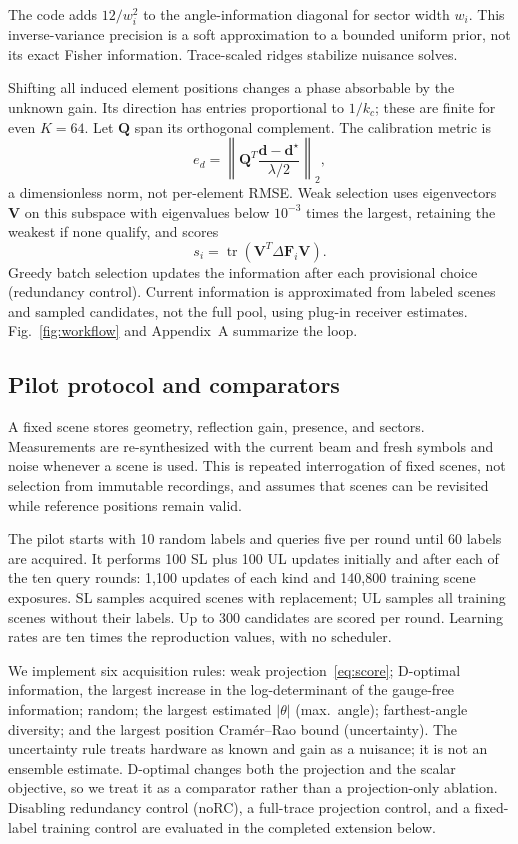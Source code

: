 \documentclass[conference]{IEEEtran}
\newcommand{\F}{\mathbf{F}}
\begin{document}
The code adds $12/w_i^2$ to the angle-information diagonal for sector width $w_i$. This inverse-variance precision is a soft approximation to a bounded uniform prior, not its exact Fisher information. Trace-scaled ridges stabilize nuisance solves.

Shifting all induced element positions changes a phase absorbable by the unknown gain. Its direction has entries proportional to $1/k_c$; these are finite for even $K=64$. Let $\mathbf Q$ span its orthogonal complement. The calibration metric is
\begin{equation}
 e_d=\left\|\mathbf Q^T
       \frac{\widehat{\mathbf d}-\mathbf d^\star}{\lambda/2}\right\|_2,
 \label{eq:calib}
\end{equation}
a dimensionless norm, not per-element RMSE. Weak selection uses eigenvectors $\mathbf V$ on this subspace with eigenvalues below $10^{-3}$ times the largest, retaining the weakest if none qualify, and scores
\begin{equation}
 s_i=\operatorname{tr}(\mathbf V^T\Delta\F_i\mathbf V).
 \label{eq:score}
\end{equation}
Greedy batch selection updates the information after each provisional choice (redundancy control). Current information is approximated from labeled scenes and sampled candidates, not the full pool, using plug-in receiver estimates. Fig.~\ref{fig:workflow} and Appendix~A summarize the loop.

\subsection{Pilot protocol and comparators}
A fixed scene stores geometry, reflection gain, presence, and sectors. Measurements are re-synthesized with the current beam and fresh symbols and noise whenever a scene is used. This is repeated interrogation of fixed scenes, not selection from immutable recordings, and assumes that scenes can be revisited while reference positions remain valid.

The pilot starts with 10 random labels and queries five per round until 60 labels are acquired. It performs 100 SL plus 100 UL updates initially and after each of the ten query rounds: 1,100 updates of each kind and 140,800 training scene exposures. SL samples acquired scenes with replacement; UL samples all training scenes without their labels. Up to 300 candidates are scored per round. Learning rates are ten times the reproduction values, with no scheduler.

We implement six acquisition rules: weak projection~\eqref{eq:score}; D-optimal information, the largest increase in the log-determinant of the gauge-free information; random; the largest estimated $|\theta|$ (max.\ angle); farthest-angle diversity; and the largest position Cram\'er--Rao bound (uncertainty). The uncertainty rule treats hardware as known and gain as a nuisance; it is not an ensemble estimate. D-optimal changes both the projection and the scalar objective, so we treat it as a comparator rather than a projection-only ablation. Disabling redundancy control (noRC), a full-trace projection control, and a fixed-label training control are evaluated in the completed extension below.
\end{document}
